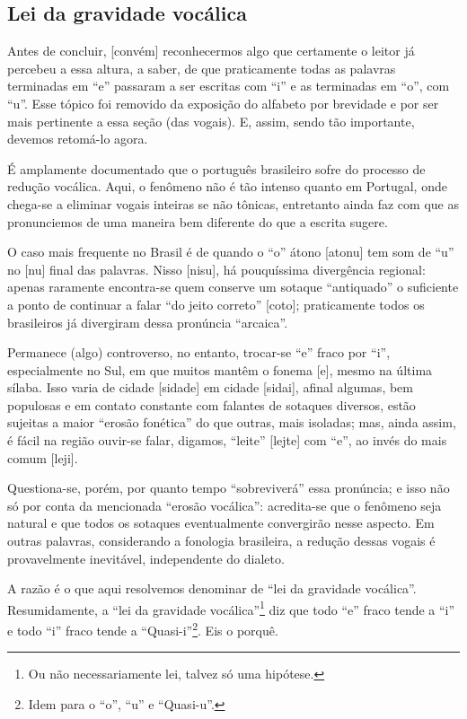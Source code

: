 \documentclass[12pt, a5paper, titlepage]{article}
\begin{document}
\subsection{Lei da gravidade vocálica}
Antes de concluir, [convém] reconhecermos algo que certamente o leitor já percebeu a essa altura, a saber, de que praticamente todas as palavras terminadas em ``e'' passaram a ser escritas com ``i'' e as terminadas em ``o'', com ``u''. Esse tópico foi removido da exposição do alfabeto por brevidade e por ser mais pertinente a essa seção (das vogais). E, assim, sendo tão importante, devemos retomá-lo agora.

É amplamente documentado que o português brasileiro sofre do processo de redução vocálica.
Aqui, o fenômeno não é tão intenso quanto em Portugal, onde chega-se a eliminar vogais inteiras se não tônicas, entretanto ainda faz com que as pronunciemos de uma maneira bem diferente do que a escrita sugere.

O caso mais frequente no Brasil é de quando o ``o'' átono [\textprimstress atonu] tem som de ``u'' no [nu] final das palavras. Nisso [\textprimstress nisu], há pouquíssima divergência regional: apenas raramente encontra-se quem conserve um sotaque ``antiquado'' o suficiente a ponto de continuar a falar ``do jeito correto'' [co\textprimstress\textfishhookr\textepsilon to]; praticamente todos os brasileiros já divergiram dessa pronúncia ``arcaica''.

Permanece (algo) controverso, no entanto, trocar-se ``e'' fraco por ``i'', especialmente no Sul, em que muitos mantêm o fonema [e], mesmo na última sílaba. Isso varia de cidade [si\textprimstress dade] em cidade [si\textprimstress dai], afinal algumas, bem populosas e em contato constante com falantes de sotaques diversos, estão sujeitas a maior ``erosão fonética'' do que outras, mais isoladas; mas, ainda assim, é fácil na região ouvir-se falar, digamos, ``leite'' [\textprimstress lejte] com ``e'', ao invés do mais comum [\textprimstress leji].

Questiona-se, porém, por quanto tempo ``sobreviverá'' essa pronúncia; e isso não só por conta da mencionada ``erosão vocálica'': acredita-se que o fenômeno seja natural e que todos os sotaques eventualmente convergirão nesse aspecto. Em outras palavras, considerando a fonologia brasileira, a redução dessas vogais é provavelmente inevitável, independente do dialeto.

A razão é o que aqui resolvemos denominar de ``lei da gravidade vocálica''. Resumidamente, a ``lei da gravidade vocálica''\footnote{
    Ou não necessariamente lei, talvez só uma hipótese.
} diz que todo ``e'' fraco tende a ``i'' e todo ``i'' fraco tende a ``Quasi-i''\footnote{
    Idem para o ``o'', ``u'' e ``Quasi-u''.
}. Eis o porquê.
\end{document}
